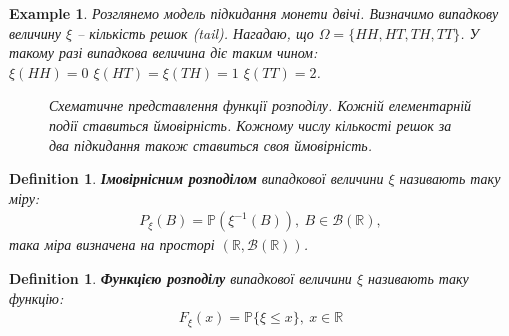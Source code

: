 \documentclass[a4paper, 10pt]{article}
\theoremstyle{theoremdd}
\newtheorem{definition}[theorem]{Definition}
\newtheorem{example}[theorem]{Example}
\begin{document}
\begin{example}
Розглянемо модель підкидання монети двічі. Визначимо випадкову величину $\xi$ -- кількість решок (tail). Нагадаю, що $\Omega = \{HH,HT,TH,TT\}$. У такому разі випадкова величина діє таким чином:\\
$\xi(HH) = 0$ \qquad $\xi(HT) = \xi(TH) = 1$ \qquad $\xi(TT) = 2$.
\begin{figure}[H]
\centering
{}
\caption*{Схематичне представлення функції розподілу. Кожній елементарній події ставиться ймовірність. Кожному числу кількості решок за два підкидання також ставиться своя ймовірність.}
\end{figure}
\end{example}

\begin{definition}
\textbf{Імовірнісним розподілом} випадкової величини $\xi$ називають таку міру:
\begin{align*}
P_\xi(B) = \mathbb{P}(\xi^{-1}(B)),\ B \in \mathcal{B}(\mathbb{R}),
\end{align*}
така міра визначена на просторі $(\mathbb{R}, \mathcal{B}(\mathbb{R}))$.
\end{definition}

\begin{definition}
\textbf{Функцією розподілу} випадкової величини $\xi$ називають таку функцію:
\begin{align*}
F_\xi(x) = \mathbb{P}\{\xi \leq x\},\ x \in \mathbb{R}
\end{align*}
\end{definition}
\end{document}
